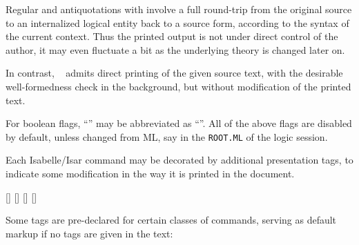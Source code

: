 \begin{isabellebody}
\begin{isamarkuptext}
\begin{description}
  Regular  and  antiquotations with  involve a full round-trip from the original source
  to an internalized logical entity back to a source form, according
  to the syntax of the current context.  Thus the printed output is
  not under direct control of the author, it may even fluctuate a bit
  as the underlying theory is changed later on.

  In contrast, \hyperlink{antiquotation option.source}{\mbox{}}~
  admits direct printing of the given source text, with the desirable
  well-formedness check in the background, but without modification of
  the printed text.

  \end{description}

  For boolean flags, ``'' may be abbreviated as
  ``''.  All of the above flags are disabled by default,
  unless changed from ML, say in the \verb|ROOT.ML| of the
  logic session.%
\end{isamarkuptext}%
\isamarkuptrue%
%
\isamarkuptrue%
%
\begin{isamarkuptext}%
Each Isabelle/Isar command may be decorated by additional
  presentation tags, to indicate some modification in the way it is
  printed in the document.

  \begin{railoutput}
\rail@plus
{}
[]
\rail@endplus
\rail@end
{}
[]
\rail@bar
{}[]
[]
\rail@endbar
\rail@end
\end{railoutput}


  Some tags are pre-declared for certain classes of commands, serving
  as default markup if no tags are given in the text:


\end{isamarkuptext}
\end{isabellebody}
